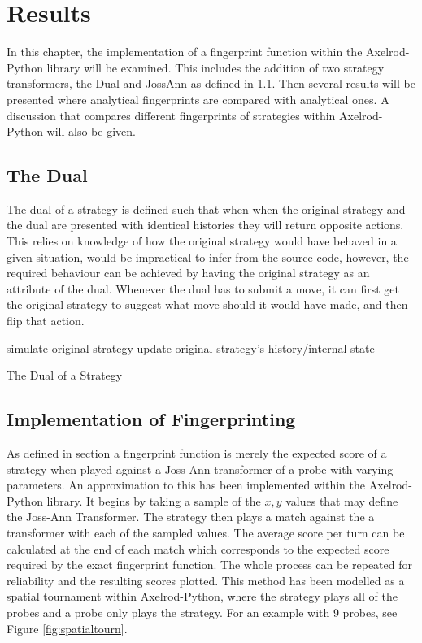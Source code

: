 
\chapter{Results}\label{cha:results}

In this chapter, the implementation of a fingerprint function within the Axelrod-Python library will be examined.
This includes the addition of two strategy transformers, the Dual and JossAnn as defined in \ref{}. %
Then several results will be presented where analytical fingerprints are compared with analytical ones.
A discussion that compares different fingerprints of strategies within Axelrod-Python will also be given.

\section{The Dual}
The dual of a strategy is defined such that when when the original strategy and the dual are presented with identical histories they will return opposite actions.
This relies on knowledge of how the original strategy would have behaved in a given situation, would be impractical to infer from the source code, however, the required behaviour can be achieved by having the original strategy as an attribute of the dual.
Whenever the dual has to submit a move, it can first get the original strategy to suggest what move should it would have made, and then flip that action.

\IncMargin{1.2em}
\begin{algorithm}[H]
  simulate original strategy\;
  update original strategy's history/internal state\;
 \caption{The Dual of a Strategy}
\end{algorithm}\DecMargin{1.5em}

\section{Implementation of Fingerprinting}\label{sec:fingerprint-implementation}

As defined in section a fingerprint function is merely the expected score of a strategy when played against a Joss-Ann transformer of a probe with varying parameters. %
An approximation to this has been implemented within the Axelrod-Python library.
It begins by taking a sample of the $x,y$ values that may define the Joss-Ann Transformer.
The strategy then plays a match against the a transformer with each of the sampled values.
The average score per turn can be calculated at the end of each match which corresponds to the expected score required by the exact fingerprint function.
The whole process can be repeated for reliability and the resulting scores plotted.
This method has been modelled as a spatial tournament within Axelrod-Python, where the strategy plays all of the probes and a probe only plays the strategy.
For an example with 9 probes, see Figure \ref{fig:spatialtourn}.

